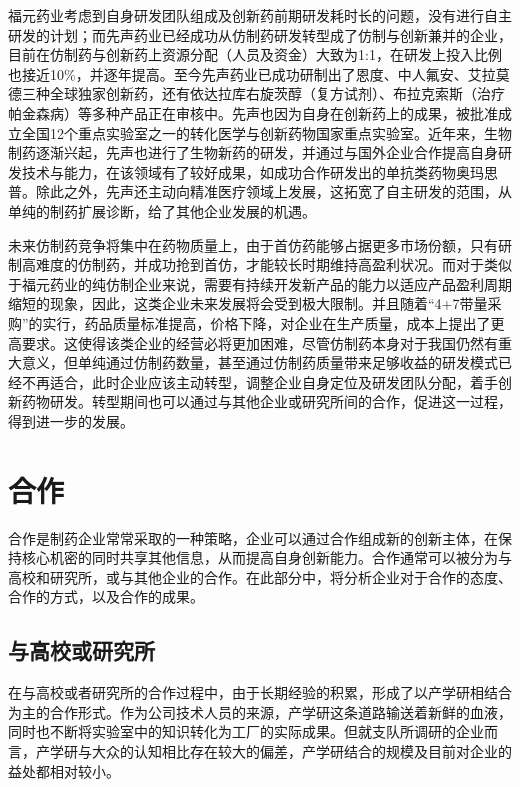 \documentclass[twocolumn,openany]{ctexbook}
\begin{document}
			福元药业考虑到自身研发团队组成及创新药前期研发耗时长的问题，没有进行自主研发的计划；而先声药业已经成功从仿制药研发转型成了仿制与创新兼并的企业，目前在仿制药与创新药上资源分配（人员及资金）大致为1:1，在研发上投入比例也接近10\%，并逐年提高。至今先声药业已成功研制出了恩度、中人氟安、艾拉莫德三种全球独家创新药，还有依达拉库右旋茨醇（复方试剂）、布拉克索斯（治疗帕金森病）等多种产品正在审核中。先声也因为自身在创新药上的成果，被批准成立全国12个重点实验室之一的转化医学与创新药物国家重点实验室。近年来，生物制药逐渐兴起，先声也进行了生物新药的研发，并通过与国外企业合作提高自身研发技术与能力，在该领域有了较好成果，如成功合作研发出的单抗类药物奥玛思普。除此之外，先声还主动向精准医疗领域上发展，这拓宽了自主研发的范围，从单纯的制药扩展诊断，给了其他企业发展的机遇。
			
			\begin{framed}
				未来仿制药竞争将集中在药物质量上，由于首仿药能够占据更多市场份额，只有研制高难度的仿制药，并成功抢到首仿，才能较长时期维持高盈利状况。而对于类似于福元药业的纯仿制企业来说，需要有持续开发新产品的能力以适应产品盈利周期缩短的现象，因此，这类企业未来发展将会受到极大限制。并且随着“4+7带量采购”的实行，药品质量标准提高，价格下降，对企业在生产质量，成本上提出了更高要求。这使得该类企业的经营必将更加困难，尽管仿制药本身对于我国仍然有重大意义，但单纯通过仿制药数量，甚至通过仿制药质量带来足够收益的研发模式已经不再适合，此时企业应该主动转型，调整企业自身定位及研发团队分配，着手创新药物研发。转型期间也可以通过与其他企业或研究所间的合作，促进这一过程，得到进一步的发展。
			\end{framed}
			
		\section{合作}
		合作是制药企业常常采取的一种策略，企业可以通过合作组成新的创新主体，在保持核心机密的同时共享其他信息，从而提高自身创新能力。合作通常可以被分为与高校和研究所，或与其他企业的合作。在此部分中，将分析企业对于合作的态度、合作的方式，以及合作的成果。
		
			\subsection{与高校或研究所}
			在与高校或者研究所的合作过程中，由于长期经验的积累，形成了以产学研相结合为主的合作形式。作为公司技术人员的来源，产学研这条道路输送着新鲜的血液，同时也不断将实验室中的知识转化为工厂的实际成果。但就支队所调研的企业而言，产学研与大众的认知相比存在较大的偏差，产学研结合的规模及目前对企业的益处都相对较小。
			
\end{document}
